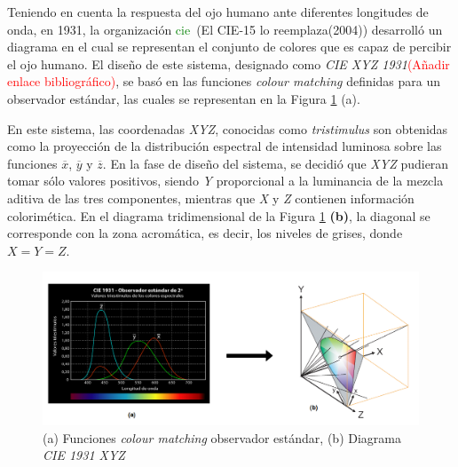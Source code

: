\documentclass[a4paper, 12pt]{report}
\begin{document}
Teniendo en cuenta la respuesta del ojo humano ante diferentes longitudes de onda, en 1931, la organización \textcolor{green}{cie}\textcolor{red}{~\cite{nondefined:_cie1931}}(El CIE-15 lo reemplaza(2004))  desarrolló un diagrama  en el cual se representan el conjunto de colores que es capaz de percibir el ojo humano. El diseño de este sistema, designado como \textit{CIE XYZ 1931}\textcolor{red}{(Añadir enlace bibliográfico)}, se basó en las funciones \textit{colour matching} definidas para un observador estándar, las cuales se representan en la Figura \ref{fig:tristimulus_cie2d} (a).

En este sistema, las coordenadas \textit{XYZ}, conocidas como \textit{tristimulus} son obtenidas como la proyección de la distribución espectral de intensidad luminosa sobre las funciones $\overline{x}$, $\overline{y}$ y $\overline{z}$. En la fase de diseño del sistema,  se decidió  que \textit{XYZ} pudieran tomar sólo valores positivos, siendo \textit{Y} proporcional a la luminancia de la mezcla aditiva de las tres componentes, mientras que \textit{X} y \textit{Z} contienen información colorimética. En el diagrama tridimensional  de la Figura \ref{fig:tristimulus_cie2d} \textbf{(b)}, la diagonal se corresponde con la zona acromática, es decir, los niveles de grises, donde $X=Y=Z$.\

\begin{figure}[H]
    \centering
    \includegraphics[width=14cm, keepaspectratio]{img/3_Fundamentos_de_Television/3_1_Formatos_de_TV_Tradicionales/3_1_1_Colorimetria/2_tristimulus_cie3d.png}
    \caption{(a) Funciones \textit{colour matching} observador estándar, (b) Diagrama \textit{CIE 1931 XYZ}}
    \label{fig:tristimulus_cie2d}
\end{figure}
\end{document}
